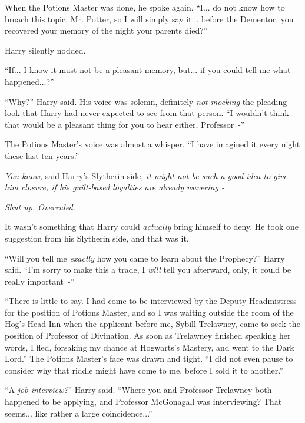 When the Potions Master was done, he spoke again. ``I... do not know how to broach this topic, Mr. Potter, so I will simply say it... before the Dementor, you recovered your memory of the night your parents died?''

Harry silently nodded.

``If... I know it must not be a pleasant memory, but... if you could tell me what happened...?''

``Why?'' Harry said. His voice was solemn, definitely \emph{not mocking} the pleading look that Harry had never expected to see from that person. ``I wouldn't think that would be a pleasant thing for you to hear either, Professor~-''

The Potions Master's voice was almost a whisper. ``I have imagined it every night these last ten years.''

\emph{You know,} said Harry's Slytherin side, \emph{it might not be such a good idea to give him closure, if his guilt-based loyalties are already wavering -}

\emph{Shut up. Overruled.}

It wasn't something that Harry could \emph{actually} bring himself to deny. He took one suggestion from his Slytherin side, and that was it.

``Will you tell me \emph{exactly} how you came to learn about the Prophecy?'' Harry said. ``I'm sorry to make this a trade, I \emph{will} tell you afterward, only, it could be really important~-''

``There is little to say. I had come to be interviewed by the Deputy Headmistress for the position of Potions Master, and so I was waiting outside the room of the Hog's Head Inn when the applicant before me, Sybill Trelawney, came to seek the position of Professor of Divination. As soon as Trelawney finished speaking her words, I fled, forsaking my chance at Hogwarts's Mastery, and went to the Dark Lord.'' The Potions Master's face was drawn and tight. ``I did not even pause to consider why that riddle might have come to me, before I sold it to another.''

``A \emph{job interview?}'' Harry said. ``Where you and Professor Trelawney both happened to be applying, and Professor McGonagall was interviewing? That seems... like rather a large coincidence...''

